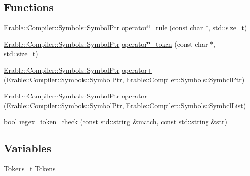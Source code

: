 \subsection*{Functions}
\begin{DoxyCompactItemize}
\item 
\mbox{\hyperlink{namespace_erable_1_1_compiler_1_1_symbols_a8f0bc762f448ea4d84e8713ab3e140b9}{Erable\+::\+Compiler\+::\+Symbols\+::\+Symbol\+Ptr}} \mbox{\hyperlink{namespace_erable_1_1_compiler_a52f9bdafa61786211189defd613c141f}{operator\char`\"{}\char`\"{}\+\_\+rule}} (const char $\ast$, std\+::size\+\_\+t)
\item 
\mbox{\hyperlink{namespace_erable_1_1_compiler_1_1_symbols_a8f0bc762f448ea4d84e8713ab3e140b9}{Erable\+::\+Compiler\+::\+Symbols\+::\+Symbol\+Ptr}} \mbox{\hyperlink{namespace_erable_1_1_compiler_a12e383814331039594edb91cc0b9ecd0}{operator\char`\"{}\char`\"{}\+\_\+token}} (const char $\ast$, std\+::size\+\_\+t)
\item 
\mbox{\hyperlink{namespace_erable_1_1_compiler_1_1_symbols_a8f0bc762f448ea4d84e8713ab3e140b9}{Erable\+::\+Compiler\+::\+Symbols\+::\+Symbol\+Ptr}} \mbox{\hyperlink{namespace_erable_1_1_compiler_ae3989a29a829966e863310ccf942e128}{operator+}} (\mbox{\hyperlink{namespace_erable_1_1_compiler_1_1_symbols_a8f0bc762f448ea4d84e8713ab3e140b9}{Erable\+::\+Compiler\+::\+Symbols\+::\+Symbol\+Ptr}}, \mbox{\hyperlink{namespace_erable_1_1_compiler_1_1_symbols_a8f0bc762f448ea4d84e8713ab3e140b9}{Erable\+::\+Compiler\+::\+Symbols\+::\+Symbol\+Ptr}})
\item 
\mbox{\hyperlink{namespace_erable_1_1_compiler_1_1_symbols_a8f0bc762f448ea4d84e8713ab3e140b9}{Erable\+::\+Compiler\+::\+Symbols\+::\+Symbol\+Ptr}} \mbox{\hyperlink{namespace_erable_1_1_compiler_aacc636f803005d91d33967aa3701c50d}{operator-\/}} (\mbox{\hyperlink{namespace_erable_1_1_compiler_1_1_symbols_a8f0bc762f448ea4d84e8713ab3e140b9}{Erable\+::\+Compiler\+::\+Symbols\+::\+Symbol\+Ptr}}, \mbox{\hyperlink{namespace_erable_1_1_compiler_1_1_symbols_a63e8157d2f729d4689d27bacad42f8ed}{Erable\+::\+Compiler\+::\+Symbols\+::\+Symbol\+List}})
\item 
bool \mbox{\hyperlink{namespace_erable_1_1_compiler_a2c50de6598a6601138e95a5674740f7a}{regex\+\_\+token\+\_\+check}} (const std\+::string \&match, const std\+::string \&str)
\end{DoxyCompactItemize}
\subsection*{Variables}
\begin{DoxyCompactItemize}
\item 
\mbox{\hyperlink{class_erable_1_1_compiler_1_1_tokens__t}{Tokens\+\_\+t}} \mbox{\hyperlink{namespace_erable_1_1_compiler_a6b3163502e436c7fe366b412429d8619}{Tokens}}
\end{DoxyCompactItemize}


